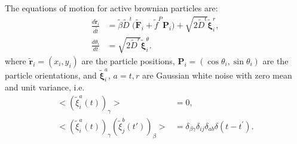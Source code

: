 \documentclass[twocolumn,amsmath,amssymb,aps]{revtex4-1}%
\begin{document}
The equations of motion for active brownian particles are:
\begin{subequations}
  \label{eqs:basicABPsODEs_dimensional}
  \begin{align}
    \frac{d\tilde{\bm{r}}_i}{d\tilde{t}}&=\tilde{\beta}
    \tilde{D}^t\big(\tilde{\bm{F}}_i
    +\tilde{f}^P\bm{P}_i\big)
    +\sqrt{2\tilde{D}^t}\tilde{\bm{\xi}}^r_i,\\
    \frac{d\theta_i}{dt}&=\sqrt{2\tilde{D}^r}
    \tilde{\bm{\xi}}^{\theta}_i.
  \end{align}
\end{subequations}
where $\tilde{\bm{r}}_i=(x_i,y_i)$ are the particle positions,
$\bm{P}_i=(\cos\theta_i,\sin\theta_i)$ are the particle orientations,
and $\tilde{\bm{\xi}}^{a}_i$, $a=t,r$ are Gaussian white noise
with zero mean and unit variance, i.e.
\begin{subequations}
  \begin{align}
    \big<(\tilde{\xi}^a_i(t))_{\gamma}\big>&=0,\\
    \big<(\tilde{\xi}^a_i(t))_{\gamma}(\tilde{\xi}^b_j(t'))_{\beta}\big>
    &=\delta_{\beta\gamma}\delta_{ij}\delta_{ab}\delta(t-t^{\prime}).
  \end{align}
\end{subequations}
\end{document}
